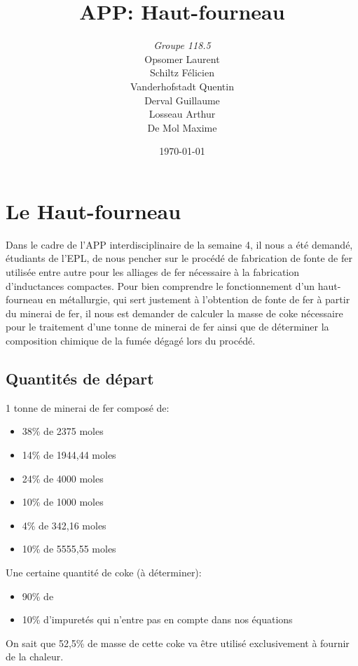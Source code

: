 \documentclass[11pt,a4paper]{report}
\author{\textit{Groupe 118.5} \\Opsomer Laurent\\ Schiltz Félicien\\Vanderhofstadt Quentin\\Derval Guillaume\\Losseau Arthur\\De Mol Maxime}
\title{APP: Haut-fourneau}
\date{\today}
\begin{document}
\maketitle
\tableofcontents

\chapter{Le Haut-fourneau}

Dans le cadre de l'APP interdisciplinaire de la semaine 4, il nous a été demandé, étudiants de l'EPL, de nous pencher sur le procédé de fabrication de fonte de fer utilisée entre autre pour les alliages de fer nécessaire à la fabrication d'inductances compactes. Pour bien comprendre le fonctionnement d'un haut-fourneau en métallurgie, qui sert justement à l'obtention de fonte de fer à partir du minerai de fer, il nous est demander de calculer la masse de coke nécessaire pour le traitement d'une tonne de minerai de fer ainsi que de déterminer la composition chimique de la fumée dégagé lors du procédé.\\

\section{Quantités de départ}

1 tonne de minerai de fer composé de:
\begin{itemize}
\item{38\% de \chemical{->} 2375 moles}
\item{14\% de \chemical{->} 1944,44 moles}
\item{24\% de \chemical{->}  4000 moles}
\item{10\% de \chemical{->} 1000 moles}
\item{4\% de \chemical{->} 342,16 moles}
\item{10\% de \chemical{->} 5555,55 moles}\\
\end{itemize}


Une certaine quantité de coke (à déterminer):
\begin{itemize}
\item{90\% de }
\item{10\% d'impuretés qui n'entre pas en compte dans nos équations}
\end{itemize}
On sait que 52,5\% de masse de cette coke va être utilisé exclusivement à fournir de la chaleur.\\
\end{document}
